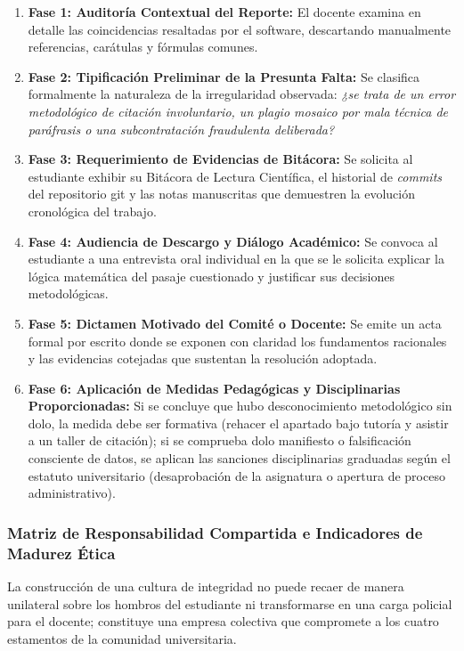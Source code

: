 \begin{enumerate}
    \item \textbf{Fase 1: Auditoría Contextual del Reporte:} El docente examina en detalle las coincidencias resaltadas por el software, descartando manualmente referencias, carátulas y fórmulas comunes.
    \item \textbf{Fase 2: Tipificación Preliminar de la Presunta Falta:} Se clasifica formalmente la naturaleza de la irregularidad observada: \textsl{¿se trata de un error metodológico de citación involuntario, un plagio mosaico por mala técnica de paráfrasis o una subcontratación fraudulenta deliberada?}
    \item \textbf{Fase 3: Requerimiento de Evidencias de Bitácora:} Se solicita al estudiante exhibir su Bitácora de Lectura Científica, el historial de \textit{commits} del repositorio git y las notas manuscritas que demuestren la evolución cronológica del trabajo.
    \item \textbf{Fase 4: Audiencia de Descargo y Diálogo Académico:} Se convoca al estudiante a una entrevista oral individual en la que se le solicita explicar la lógica matemática del pasaje cuestionado y justificar sus decisiones metodológicas.
    \item \textbf{Fase 5: Dictamen Motivado del Comité o Docente:} Se emite un acta formal por escrito donde se exponen con claridad los fundamentos racionales y las evidencias cotejadas que sustentan la resolución adoptada.
    \item \textbf{Fase 6: Aplicación de Medidas Pedagógicas y Disciplinarias Proporcionadas:} Si se concluye que hubo desconocimiento metodológico sin dolo, la medida debe ser formativa (rehacer el apartado bajo tutoría y asistir a un taller de citación); si se comprueba dolo manifiesto o falsificación consciente de datos, se aplican las sanciones disciplinarias graduadas según el estatuto universitario (desaprobación de la asignatura o apertura de proceso administrativo).
\end{enumerate}

\subsubsection{Matriz de Responsabilidad Compartida e Indicadores de Madurez Ética}

La construcción de una cultura de integridad no puede recaer de manera unilateral sobre los hombros del estudiante ni transformarse en una carga policial para el docente; constituye una empresa colectiva que compromete a los cuatro estamentos de la comunidad universitaria.


